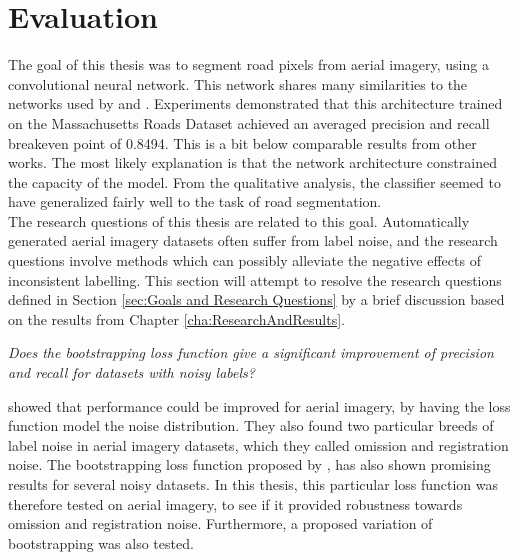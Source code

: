 \section{Evaluation}
\label{sec:SummaryDiscussion}
The goal of this thesis was to segment road pixels from aerial imagery, using a convolutional neural network. This network shares many similarities to the networks used by \cite{Mnih_aerial_images_noisy} and \citep{MnihThesis}. Experiments demonstrated that this architecture trained on the Massachusetts Roads Dataset achieved an averaged precision and recall breakeven point of 0.8494. This is a bit below comparable results from other works. The most likely explanation is that the network architecture constrained the capacity of the model. From the qualitative analysis, the classifier seemed to have generalized fairly well to the task of road segmentation.\\

 The research questions of this thesis are related to this goal. Automatically generated aerial imagery datasets often suffer from label noise, and the research questions involve methods which can possibly alleviate the negative effects of inconsistent labelling. This section will attempt to resolve the research questions defined in Section \ref{sec:Goals and Research Questions} by a brief discussion based on the results from Chapter \ref{cha:ResearchAndResults}.
 
\begin{description}[ style=nextline, leftmargin=1.5em, rightmargin=1.5em]
\item[Research question 1:]{\it Does the bootstrapping loss function give a significant improvement of precision and recall for datasets with noisy labels?}
\end{description}

\cite{Mnih_aerial_images_noisy} showed that performance could be improved for aerial imagery, by having the loss function model the noise distribution. They also found two particular breeds of label noise in aerial imagery datasets, which they called omission and registration noise. The bootstrapping loss function proposed by \cite{Reed_noisy_labels_bootstrapping}, has also shown promising results for several noisy datasets. In this thesis, this particular loss function was therefore tested on aerial imagery, to see if it provided robustness towards omission and registration noise. Furthermore, a proposed variation of bootstrapping was also tested.\\

